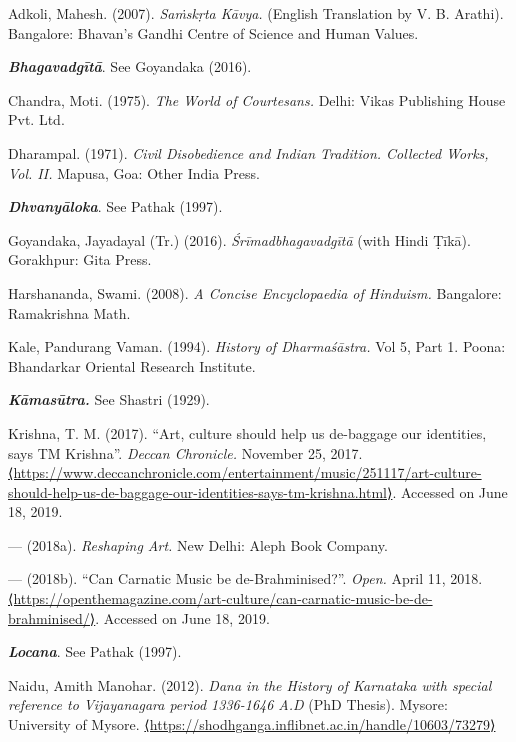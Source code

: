 \begin{thebibliography}{99}
\itemsep=0pt

  Adkoli, Mahesh. (2007). \textit{Saṁskṛta Kāvya.} (English Translation by V. B. Arathi). Bangalore: Bhavan’s Gandhi Centre of Science and Human Values.

  \textit{\textbf{Bhagavadgītā}}. See Goyandaka (2016).

  Chandra, Moti. (1975). \textit{The World of Courtesans.} Delhi: Vikas Publishing House Pvt. Ltd.

  Dharampal. (1971). \textit{Civil Disobedience and Indian Tradition. Collected Works, Vol. II.} Mapusa, Goa: Other India Press.

  \textit{\textbf{Dhvanyāloka}}. See Pathak (1997).

  Goyandaka, Jayadayal (Tr.) (2016). \textit{Śrīmadbhagavadgītā} (with Hindi Ṭīkā). Gorakhpur: Gita Press.

  Harshananda, Swami. (2008). \textit{A Concise Encyclopaedia of Hinduism.} Bangalore: Ramakrishna Math.

  Kale, Pandurang Vaman. (1994). \textit{History of Dharmaśāstra.} Vol 5, Part 1. Poona: Bhandarkar Oriental Research Institute.

  \textit{\textbf{Kāmasūtra.}} See Shastri (1929).

  Krishna, T. M. (2017). “Art, culture should help us de-baggage our identities, says TM Krishna”. \textit{Deccan Chronicle.} November 25, 2017. \url{⟨https://www.deccanchronicle.com/entertainment/music/251117/art-culture-should-help-us-de-baggage-our-identities-says-tm-krishna.html⟩}. Accessed on June 18, 2019.

  — (2018a). \textit{Reshaping Art.} New Delhi: Aleph Book Company.

  — (2018b). “Can Carnatic Music be de-Brahminised?”. \textit{Open.} April 11, 2018. \url{⟨https://openthemagazine.com/art-culture/can-carnatic-music-be-de-brahminised/⟩}. Accessed on June 18, 2019.

  \textit{\textbf{Locana}}. See Pathak (1997).

  Naidu, Amith Manohar. (2012). \textit{Dana in the History of Karnataka with special reference to Vijayanagara period 1336-1646 A.D} (PhD Thesis). Mysore: University of Mysore. \url{⟨https://shodhganga.inflibnet.ac.in/handle/10603/73279⟩}


\end{thebibliography}

